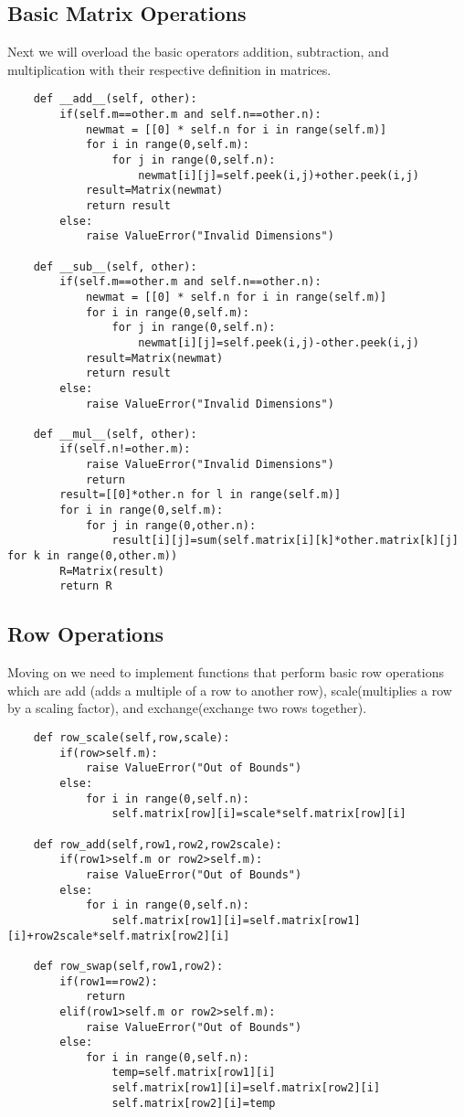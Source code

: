 \subsection{Basic Matrix Operations}
Next we will overload the basic operators addition, subtraction, and multiplication with their respective definition in matrices.
\begin{lstlisting}
    def __add__(self, other):
        if(self.m==other.m and self.n==other.n):
            newmat = [[0] * self.n for i in range(self.m)]
            for i in range(0,self.m):
                for j in range(0,self.n):
                    newmat[i][j]=self.peek(i,j)+other.peek(i,j)
            result=Matrix(newmat)
            return result
        else:
            raise ValueError("Invalid Dimensions")

    def __sub__(self, other):
        if(self.m==other.m and self.n==other.n):
            newmat = [[0] * self.n for i in range(self.m)]
            for i in range(0,self.m):
                for j in range(0,self.n):
                    newmat[i][j]=self.peek(i,j)-other.peek(i,j)
            result=Matrix(newmat)
            return result
        else:
            raise ValueError("Invalid Dimensions")
    
    def __mul__(self, other):
        if(self.n!=other.m):
            raise ValueError("Invalid Dimensions")
            return
        result=[[0]*other.n for l in range(self.m)]
        for i in range(0,self.m):
            for j in range(0,other.n):
                result[i][j]=sum(self.matrix[i][k]*other.matrix[k][j] for k in range(0,other.m))
        R=Matrix(result)
        return R
\end{lstlisting}
\subsection{Row Operations}
Moving on we need to implement functions that perform basic row operations which are 
add (adds a multiple of a row to another row), 
scale(multiplies a row by a scaling factor),  
and exchange(exchange two rows together). 
 \begin{lstlisting}
    def row_scale(self,row,scale):
        if(row>self.m):
            raise ValueError("Out of Bounds")
        else:
            for i in range(0,self.n):
                self.matrix[row][i]=scale*self.matrix[row][i]

    def row_add(self,row1,row2,row2scale):
        if(row1>self.m or row2>self.m):
            raise ValueError("Out of Bounds")
        else:
            for i in range(0,self.n):
                self.matrix[row1][i]=self.matrix[row1][i]+row2scale*self.matrix[row2][i]

    def row_swap(self,row1,row2):
        if(row1==row2):
            return
        elif(row1>self.m or row2>self.m):
            raise ValueError("Out of Bounds")
        else:
            for i in range(0,self.n):
                temp=self.matrix[row1][i]
                self.matrix[row1][i]=self.matrix[row2][i]
                self.matrix[row2][i]=temp
 \end{lstlisting}
